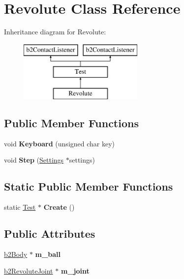\hypertarget{class_revolute}{\section{Revolute Class Reference}
\label{class_revolute}
}
Inheritance diagram for Revolute\-:\begin{figure}[H]
\begin{center}
\leavevmode
\includegraphics[height=3.000000cm]{class_revolute}
\end{center}
\end{figure}
\subsection*{Public Member Functions}
\begin{DoxyCompactItemize}
\item 
\hypertarget{class_revolute_ad0b41648cb4522d48dbcbe5d46987f97}{void {\bfseries Keyboard} (unsigned char key)}\label{class_revolute_ad0b41648cb4522d48dbcbe5d46987f97}

\item 
\hypertarget{class_revolute_acaf8605b767d34ced71b4cac9bcc68bd}{void {\bfseries Step} (\hyperlink{struct_settings}{Settings} $\ast$settings)}\label{class_revolute_acaf8605b767d34ced71b4cac9bcc68bd}

\end{DoxyCompactItemize}
\subsection*{Static Public Member Functions}
\begin{DoxyCompactItemize}
\item 
\hypertarget{class_revolute_af62edcabfe97c2cb4325f22f085b4b31}{static \hyperlink{class_test}{Test} $\ast$ {\bfseries Create} ()}\label{class_revolute_af62edcabfe97c2cb4325f22f085b4b31}

\end{DoxyCompactItemize}
\subsection*{Public Attributes}
\begin{DoxyCompactItemize}
\item 
\hypertarget{class_revolute_a1a8fe33964790a6b65d09cd6f904a7df}{\hyperlink{classb2_body}{b2\-Body} $\ast$ {\bfseries m\-\_\-ball}}\label{class_revolute_a1a8fe33964790a6b65d09cd6f904a7df}

\item 
\hypertarget{class_revolute_a84f3bcbc01089cc4626a1e64412072d4}{\hyperlink{classb2_revolute_joint}{b2\-Revolute\-Joint} $\ast$ {\bfseries m\-\_\-joint}}\label{class_revolute_a84f3bcbc01089cc4626a1e64412072d4}

\end{DoxyCompactItemize}



